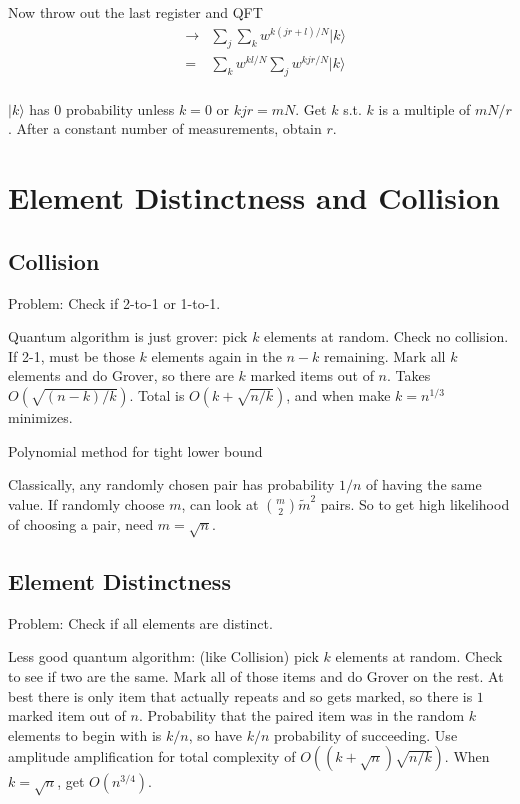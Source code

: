 \documentclass[12pt]{article}
\begin{document}
Now throw out the last register and QFT
\begin{eqnarray}
&\rightarrow&\sum_j\sum_kw^{k(jr+l)/N}|k\rangle\\
&=&\sum_kw^{kl/N}\sum_jw^{kjr/N}|k\rangle\\
\end{eqnarray}

$|k\rangle$ has 0 probability unless $k=0$ or $kjr=mN$. Get $k$ s.t. $k$ is a multiple of $mN/r$. After a constant number of measurements, obtain $r$.

\section{Element Distinctness and Collision}

\subsection{Collision}
Problem: Check if 2-to-1 or 1-to-1.

Quantum algorithm is just grover: pick $k$ elements at random. Check no collision. If 2-1, must be those $k$ elements again in the $n-k$ remaining. Mark all $k$ elements
and do Grover, so there are $k$ marked items out of $n$. Takes $O(\sqrt{(n-k)/k})$. Total is $O(k+\sqrt{n/k})$, and when make $k=n^{1/3}$ minimizes. 

Polynomial method for tight lower bound

Classically, any randomly chosen pair has probability $1/n$ of having the same value. If randomly choose $m$, can look at $\binom{m}{2}\tilde m^2$ pairs. So to get high likelihood of choosing a pair, need
$m=\sqrt{n}$.

\subsection{Element Distinctness}
Problem: Check if all elements are distinct.

Less good quantum algorithm: (like Collision) pick $k$ elements at random. Check to see if two are the same. Mark all of those items and do Grover on the rest. At best there is only item that actually repeats and so gets marked, so there is $1$ marked item out of $n$. Probability that the paired item was in the random $k$ elements to begin with is $k/n$, so have $k/n$ probability of succeeding.
Use amplitude amplification for total complexity of $O((k+\sqrt{n})\sqrt{n/k})$. When $k=\sqrt{n}$, get $O(n^{3/4})$.
\end{document}
